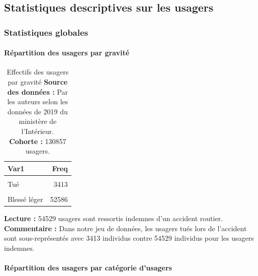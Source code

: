 \documentclass[french,]{tp}
\let\oldparagraph\paragraph
\renewcommand{\paragraph}[1]{\oldparagraph{#1}\mbox{}}
\begin{document}
\hypertarget{statistiques-descriptives-sur-les-usagers}{%
\subsection{Statistiques descriptives sur les usagers}\label{statistiques-descriptives-sur-les-usagers}}

\hypertarget{stat-glob}{%
\subsubsection{Statistiques globales}\label{stat-glob}}

\hypertarget{ruxe9partition-des-usagers-par-gravituxe9}{%
\paragraph{Répartition des usagers par gravité}\label{ruxe9partition-des-usagers-par-gravituxe9}}





\begin{table}[H]

\caption{\label{tab:tablegrav}Effectifs des usagers par gravité
\textbf{Source des données :} Par les auteurs selon les données de 2019 du ministère de l'Intérieur.\\
\textbf{Cohorte :} 130857 usagers.\\}
\centering
\begin{tabular}[t]{lr}
\toprule
\textbf{Var1} & \textbf{Freq}\\
\midrule
\cellcolor{gray!6}{Indemne} & \cellcolor{gray!6}{54529}\\
Tué & 3413\\
\cellcolor{gray!6}{Blessé hospitalisé} & \cellcolor{gray!6}{20329}\\
Blessé léger & 52586\\
\bottomrule
\end{tabular}
\end{table}

\textbf{Lecture :} 54529 usagers sont ressortis indemnes d'un accident routier.
\textbf{Commentaire :} Dans notre jeu de données, les usagers tués lors de l'accident sont sous-représentés avec 3413 individus contre 54529 individus pour les usagers indemnes.

\hypertarget{ruxe9partition-des-usagers-par-catuxe9gorie-dusagers}{%
\paragraph{Répartition des usagers par catégorie d'usagers}\label{ruxe9partition-des-usagers-par-catuxe9gorie-dusagers}}
\end{document}
